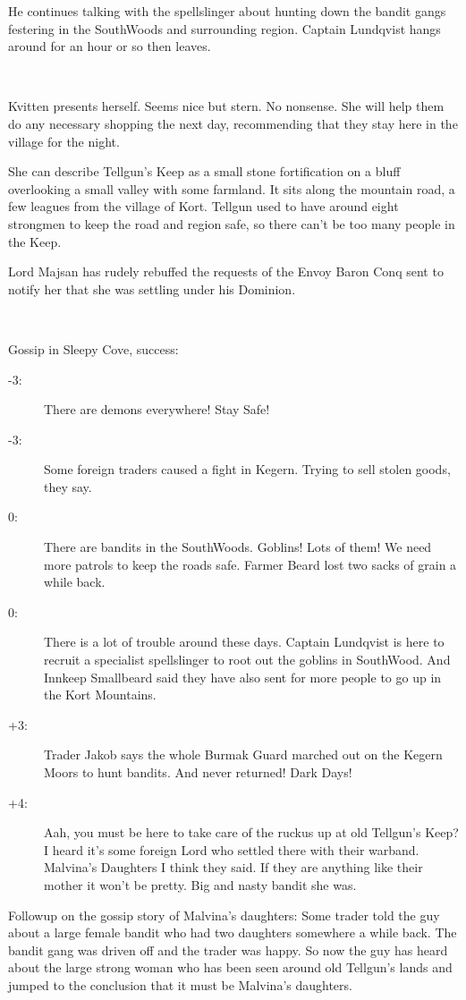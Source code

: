 He continues talking with the spellslinger about hunting down the bandit gangs festering in the SouthWoods and surrounding region. Captain Lundqvist hangs around for an hour or so then leaves.

\

Kvitten presents herself. Seems nice but stern. No nonsense. She will help them do any necessary shopping the next day, recommending that they stay here in the village for the night.

She can describe Tellgun's Keep as a small stone fortification on a bluff overlooking a small valley with some farmland. It sits along the mountain road, a few leagues from the village of Kort. Tellgun used to have around eight strongmen to keep the road and region safe, so there can't be too many people in the Keep.

Lord Majsan has rudely rebuffed the requests of the Envoy Baron Conq sent to notify her that she was settling under his Dominion.

\

\noindent
Gossip in Sleepy Cove, success:
\begin{description}
    \item[-3:] There are demons everywhere! Stay Safe!
    \item[-3:] Some foreign traders caused a fight in Kegern. Trying to sell stolen goods, they say.
    \item[0:] There are bandits in the SouthWoods. Goblins! Lots of them! We need more patrols to keep the roads safe. Farmer Beard lost two sacks of grain a while back.
    \item[0:] There is a lot of trouble around these days. Captain Lundqvist is here to recruit a specialist spellslinger to root out the goblins in SouthWood. And Innkeep Smallbeard said they have also sent for more people to go up in the Kort Mountains.
    \item[+3:] Trader Jakob says the whole Burmak Guard marched out on the Kegern Moors to hunt bandits. And never returned! Dark Days!
    \item[+4:] Aah, you must be here to take care of the ruckus up at old Tellgun's Keep? I heard it's some foreign Lord who settled there with their warband. Malvina's Daughters I think they said. If they are anything like their mother it won't be pretty. Big and nasty bandit she was.
\end{description}

Followup on the gossip story of Malvina's daughters: Some trader told the guy about a large female bandit who had two daughters somewhere a while back. The bandit gang was driven off and the trader was happy. So now the guy has heard about the large strong woman who has been seen around old Tellgun's lands and jumped to the conclusion that it must be Malvina's daughters.

